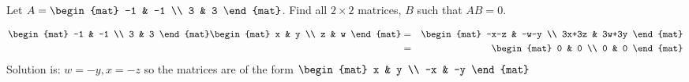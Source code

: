 
\begin{Exercise}[
name={},
title={}, 
difficulty=0,
origin={\cite{KK}}]
 Let $A=\begin{mat}
-1 & -1 \\
3 & 3
\end{mat}$. Find all $2\times 2$ matrices, $B$ such that $AB=0.$ 
\end{Exercise}

\begin{Answer}
\begin{eqnarray*}
\begin{mat}
-1 & -1 \\
3 & 3
\end{mat}
\begin{mat}
x & y \\
z & w
\end{mat} &=&
\begin{mat}
-x-z & -w-y \\
3x+3z & 3w+3y
\end{mat} \\
&=&
\begin{mat}
0 & 0 \\
0 & 0
\end{mat}
\end{eqnarray*}
Solution is: $ w=-y,x=-z $ so the
matrices are of the form $
\begin{mat}
x & y \\
-x & -y
\end{mat}$
\end{Answer}

